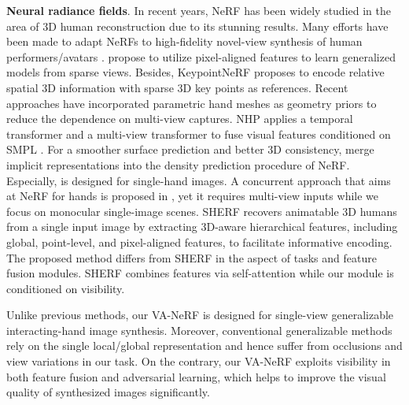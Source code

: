 \documentclass[letterpaper]{article}
\begin{document}
\textbf{Neural radiance fields}.
In recent years, NeRF \cite{mildenhall2021nerf} has been widely studied in the area of 3D human reconstruction due to its stunning results. Many efforts have been made to adapt NeRFs to high-fidelity novel-view synthesis of human performers/avatars \cite{deng2022depth,mildenhall2022nerf,johari2022geonerf,niemeyer2022regnerf, Johari_2022_CVPR,martin2021nerf}. \cite{raj2021pixel,wang2021ibrnet,yu2021pixelnerf} propose to utilize pixel-aligned features to learn generalized models from sparse views. Besides, KeypointNeRF \cite{mihajlovic2022keypointnerf} proposes to encode relative spatial 3D information with sparse 3D key points as references. Recent approaches \cite{peng2021neural,kwon2021neural} have incorporated parametric hand meshes as geometry priors to reduce the dependence on multi-view captures. NHP \cite{kwon2021neural} applies a temporal transformer and a multi-view transformer to fuse visual features conditioned on SMPL \cite{loper2015smpl}. For a smoother surface prediction and better 3D consistency, \cite{or2022stylesdf,hong2022eva3d,corona2022lisa} merge implicit representations into the density prediction procedure of NeRF. Especially, \cite{corona2022lisa} is designed for single-hand images. A concurrent approach that aims at NeRF for hands is proposed in \cite{guo2023handnerf}, yet it requires multi-view inputs while we focus on monocular single-image scenes. SHERF \cite{hu2023sherf} recovers animatable 3D humans from a single input image by extracting 3D-aware hierarchical features, including global, point-level, and pixel-aligned features, to facilitate informative encoding. The proposed method differs from SHERF in the aspect of tasks and feature fusion modules. SHERF combines features via self-attention while our module is conditioned on visibility.

Unlike previous methods, our VA-NeRF is designed for single-view generalizable interacting-hand image synthesis. Moreover, conventional generalizable methods rely on the single local/global representation and hence suffer from occlusions and view variations in our task. On the contrary, our VA-NeRF exploits visibility in both feature fusion and adversarial learning, which helps to improve the visual quality of synthesized images significantly.
\end{document}
